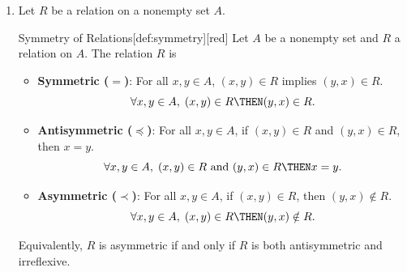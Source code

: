 \begin{enumerate}
  \newpage

  \item Let $R$ be a relation on a nonempty set $A$.
  \begin{define}{Symmetry of Relations}[def:symmetry][red]
    Let $A$ be a nonempty set and $R$ a relation on $A$. The relation $R$ is 
    \begin{itemize}
      \item \textbf{Symmetric ($=$)}: For all $x, y \in A$, $(x, y) \in R$ implies $(y, x) \in R$.
        \[
          \forall x, y \in A,\; (x, y) \in R \THEN (y, x) \in R.
        \]
      \item \textbf{Antisymmetric ($\preceq$)}: For all $x, y \in A$, if $(x, y) \in R$ and $(y, x) \in R$, then $x = y$.
        \[
          \forall x, y \in A,\; (x, y) \in R \text{ and } (y, x) \in R \THEN x = y.
        \]
      \item \textbf{Asymmetric ($\prec$)}: For all $x, y \in A$, if $(x, y) \in R$, then $(y, x) \notin R$.
        \[
          \forall x, y \in A,\; (x, y) \in R \THEN (y, x) \notin R.
        \]
    \end{itemize}
    Equivalently, $R$ is asymmetric if and only if $R$ is both antisymmetric and irreflexive.
  \end{define}


\end{enumerate}
